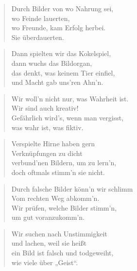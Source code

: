 \documentclass[10pt,a4paper]{article}
\begin{document}
\begin{paracol}{2}
\begin{verse}
Durch Bilder von wo Nahrung sei, \\
wo Feinde lauerten, \\
wo Freunde, kam Erfolg herbei. \\
Sie überdauerten. \\
\end{verse}

\begin{verse}
Dann spielten wir das Kokelspiel, \\
dann wuchs das Bildorgan, \\
das denkt, was keinem Tier einfiel, \\
und Macht gab uns’ren Ahn’n. \\
\end{verse}

\begin{verse}
Wir woll’n nicht nur, was Wahrheit ist. \\
Wir sind auch kreativ! \\
Gefährlich wird’s, wenn man vergisst, \\
was wahr ist, was fiktiv. \\
\end{verse}

\begin{verse}
Verspielte Hirne haben gern \\
Verknüpfungen zu dicht \\
verbund’nen Bildern, um zu lern’n, \\
doch oftmals stimm’n sie nicht. \\
\end{verse}

\begin{verse}
Durch falsche Bilder könn’n wir schlimm \\
Vom rechten Weg abkomm’n. \\
Wir prüfen, welche Bilder stimm’n, \\
um gut voranzukomm’n. \\
\end{verse}

\begin{verse}
Wir suchen nach Unstimmigkeit \\
und lachen, weil sie heißt \\
ein Bild ist falsch und todgeweiht, \\
wie viele über „Geist“. \\
\end{verse}


\end{paracol}
\end{document}
